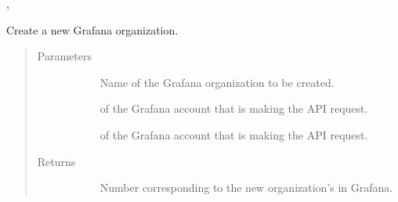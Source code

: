 \documentclass[letterpaper,10pt,english]{sphinxmanual}
\begin{document}
\begin{fulllineitems}
\begin{quote}
\begin{description}
\begin{description}
\end{description}

\end{description}\end{quote}




{\hyperref[\detokenize{grafanaAPI:grafanaAPI.createAccount}]{}}, 



\end{fulllineitems}


\begin{fulllineitems}
\label{\detokenize{grafanaAPI:grafanaAPI.createOrg}}
Create a new Grafana organization.
\begin{quote}\begin{description}
\item[{Parameters}] \leavevmode\begin{description}
\item[{}] \leavevmode{[}\sphinxtitleref{str}{]}
Name of the Grafana organization to be created.

\item[{}] \leavevmode{[}\sphinxtitleref{str}{]}
 of the Grafana account that is making the API request.

\item[{}] \leavevmode{[}\sphinxtitleref{str}{]}
 of the Grafana account that is making the API request.

\end{description}

\item[{Returns}] \leavevmode\begin{description}
\item[{}] \leavevmode{[}\sphinxtitleref{int}{]}
Number corresponding to the new organization’s  in Grafana.

\end{description}


\end{description}
\end{quote}
\end{fulllineitems}
\end{document}
